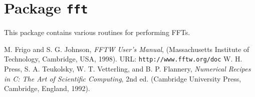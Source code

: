 \chapter{Package \texttt{fft}}

This package contains various routines for performing FFTs.

\newpage
\newpage

\newpage\begin{thebibliography}{0}
  M. Frigo and S. G. Johnson,
  \textit{FFTW User's Manual},
  (Massachusetts Institute of Technology, Cambridge, USA, 1998).
  URL: \texttt{http://www.fftw.org/doc}
  W. H. Press, S. A. Teukolsky, W. T. Vetterling, and B. P. Flannery,
  \textit{Numerical Recipes in C: The Art of Scientific Computing}, 2nd ed.
  (Cambridge University Press, Cambridge, England, 1992).
\end{thebibliography}
